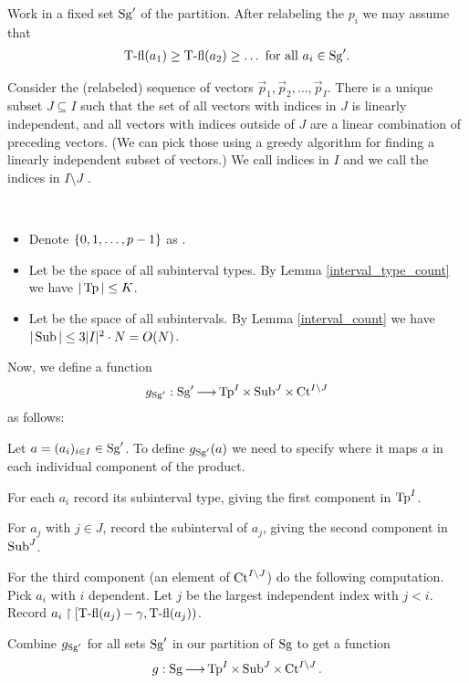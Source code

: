 Work in a fixed set $\operatorname{Sg}'$ of the partition.
After relabeling the $p_i$ we may assume that
\begin{align*}
  \operatorname{T-fl}(a_1) \geq \operatorname{T-fl}(a_2) \geq \ldots \text { for all $a_i \in \operatorname{Sg}'$}.
\end{align*}

Consider the (relabeled) sequence of vectors $\vec p_1, \vec p_2, \ldots, \vec p_I$.
There is a unique subset $J \subseteq I$ such that the set of all vectors with indices in $J$ is linearly independent,
and all vectors with indices outside of $J$ are a linear combination of preceding vectors.
(We can pick those using a greedy algorithm for finding a linearly independent subset of vectors.)
We call indices in $I$  and we call the indices in $I \setminus J$ .


\begin{Definition} \ 
  \begin{itemize}
  \item Denote $\left\{0,1, \ldots, p-1\right\}$ as .
  \item Let  be the space of all subinterval types.
    By Lemma \ref{interval_type_count} we have $|\operatorname{Tp}| \leq K$.
  \item Let  be the space of all subintervals.
    By Lemma \ref{interval_count} we have $|\operatorname{Sub}| \leq 3 |I|^2 \cdot N = O(N)$.
  \end{itemize}
\end{Definition}

\begin{Definition}
  Now, we define a function
  \begin{align*}
    g_{\operatorname{Sg}'}: \operatorname{Sg}' \operatorname{\longrightarrow} \operatorname{Tp}^I \times \operatorname{Sub}^J \times \operatorname{Ct}^{I \backslash J}
  \end{align*}
  as follows:
  
  Let $a = (a_i)_{i\in I} \in \operatorname{Sg}'$.
  To define $g_{\operatorname{Sg}'}(a)$ we need to specify where it maps $a$ in each individual component of the product.

  For each $a_i$ record its subinterval type, giving the first component in $\operatorname{Tp}^I$.

  For $a_j$ with $j \in J$, record the subinterval of $a_j$, giving the second component in $\operatorname{Sub}^J$.

  For the third component (an element of $\operatorname{Ct}^{I \backslash J}$) do the following computation.
  Pick $a_i$ with $i$ dependent.
  Let $j$ be the largest independent index with $j < i$.
  Record $a_i \upharpoonright [\operatorname{T-fl}(a_j) - \gamma, \operatorname{T-fl}(a_j))$.

  Combine $g_{\operatorname{Sg}'}$ for all sets $\operatorname{Sg}'$ in our partition of $\operatorname{Sg}$ to get a function 
  \begin{align*}
    g: \operatorname{Sg} \operatorname{\longrightarrow} \operatorname{Tp}^I \times \operatorname{Sub}^J \times \operatorname{Ct}^{I \backslash J}.  
  \end{align*}
\end{Definition}

